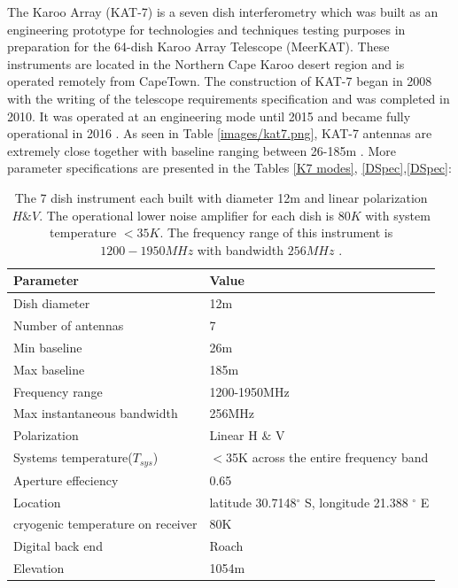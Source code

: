 The Karoo Array (KAT-7) is a seven dish interferometry which was built as an engineering prototype for technologies and techniques testing purposes in preparation for the 64-dish Karoo Array Telescope (MeerKAT). These instruments are located in the Northern Cape Karoo desert region and is operated remotely from CapeTown. The construction of  KAT-7 began in
2008 with the writing of the telescope requirements specification and was completed in 2010.  It was operated at an engineering mode until 2015  and became fully operational in 2016  \citep{foley2016engineering}. As seen in Table \ref{images/kat7.png}, KAT-7 antennas are extremely close together with baseline ranging between 26-185m \citep{carignan2013kat}. More parameter specifications are presented in the Tables \ref{K7 modes}, \ref{DSpec},\ref{DSpec}:

\begin{table}[H]\centering
\begin{tabular}{l l }
\toprule
\textbf{Parameter} & \textbf{Value}\\
\midrule
Dish diameter&12m \\
Number of antennas& 7\\
Min baseline & 26m\\
Max baseline & 185m\\
Frequency range & 1200-1950MHz\\
Max instantaneous bandwidth &256MHz\\
Polarization   & Linear H $\&$ V\\
Systems temperature($T_{sys}$) & $<$35K across the entire frequency band\\
Aperture effeciency & 0.65\\
Location &  latitude 30.7148$^{\circ}$ S, longitude 21.388 $^{\circ}$ E\\
cryogenic temperature on receiver & 80K\\
Digital back end & Roach \\
Elevation & 1054m\\
\bottomrule
\end{tabular}
\caption{The 7 dish instrument each built with diameter 12m and linear polarization $H \& V$. The operational lower noise amplifier for each dish is $80K$  with system temperature $<35K$. The frequency range of this instrument is $1200-1950 MHz$ with bandwidth $256MHz$ \citep{foley2016engineering}.}
\label{K7 spec}
\end{table}


